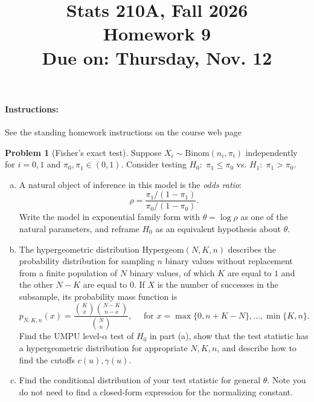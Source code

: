 \documentclass{article}
\theoremstyle{definition}
\newtheorem{problem}{Problem}
\begin{document}
\title{Stats 210A, Fall 2026\\
  Homework 9 \\
  {\large {\bf Due on}: Thursday, Nov. 12}}
\date{}

\maketitle

\paragraph{Instructions:} See the standing homework instructions on the course web page


\begin{problem}[Fisher's exact test]
\label{prob:fisher-exact}
Suppose $X_i \sim \text{Binom}(n_i, \pi_i)$ independently for $i=0,1$ and $\pi_0,\pi_1\in(0,1)$. Consider testing $H_0:\; \pi_1\leq \pi_0$ vs. $H_1:\; \pi_1 > \pi_0$.

\begin{enumerate}[(a)]
\item  A natural object of inference in this model is the {\em odds ratio}:
\[
\rho = \frac{\pi_1/(1-\pi_1)}{\pi_0/(1-\pi_0)}.
\]
Write the model in exponential family form with $\theta=\log\rho$ as one of the natural parameters, and reframe $H_0$ as an equivalent hypothesis about $\theta$.



\item  The hypergeometric distribution $\text{Hypergeom}(N,K,n)$ describes the probability distribution for sampling $n$ binary values without replacement from a finite population of $N$ binary values, of which $K$ are equal to $1$ and the other $N-K$ are equal to $0$. If $X$ is the number of successes in the subsample, its probability mass function is
\[
p_{N,K,n}(x) = \frac{\binom{K}{x}\binom{N-K}{n-x}}{\binom{N}{n}}, \quad \text{ for } x = \max\{0,n+K-N\}, \ldots, \min\{K,n\}.
\]
Find the UMPU level-$\alpha$ test of $H_0$ in part (a), show that the test statistic has a hypergeometric distribution for appropriate $N,K,n$, and describe how to find the cutoffs $c(u), \gamma(u)$.



\item Find the conditional distribution of your test statistic for general $\theta$. Note you do not need to find a closed-form expression for the normalizing constant.




\end{enumerate}
\end{problem}
\end{document}
